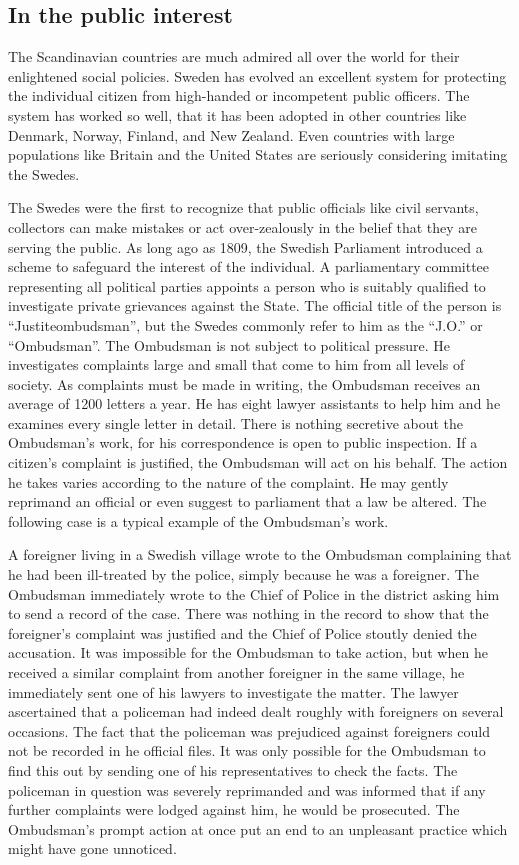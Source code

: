 \documentclass[11pt]{article}
\begin{document}
\subsection{In the public interest}
\label{sec-1-53}

The Scandinavian countries are much admired all over the world for their enlightened social policies. Sweden has evolved an excellent system for protecting the individual citizen from high-handed or incompetent public officers. The system has worked so well, that it has been adopted in other countries like Denmark, Norway, Finland, and New Zealand. Even countries with large populations like Britain and the United States are seriously considering imitating the Swedes.

The Swedes were the first to recognize that public officials like civil servants, collectors can make mistakes or act over-zealously in the belief that they are serving the public. As long ago as 1809, the Swedish Parliament introduced a scheme to safeguard the interest of the individual. A parliamentary committee representing all political parties appoints a person who is suitably qualified to investigate private grievances against the State. The official title of the person is ``Justiteombudsman'', but the Swedes commonly refer to him as the ``J.O.'' or ``Ombudsman''. The Ombudsman is not subject to political pressure. He investigates complaints large and small that come to him from all levels of society. As complaints must be made in writing, the Ombudsman receives an average of 1200 letters a year. He has eight lawyer assistants to help him and he examines every single letter in detail. There is nothing secretive about the Ombudsman's work, for his correspondence is open to public inspection. If a citizen's complaint is justified, the Ombudsman will act on his behalf. The action he takes varies according to the nature of the complaint. He may gently reprimand an official or even suggest to parliament that a law be altered. The following case is a typical example of the Ombudsman's work. 

A foreigner living in a Swedish village wrote to the Ombudsman complaining that he had been ill-treated by the police, simply because he was a foreigner. The Ombudsman immediately wrote to the Chief of Police in the district asking him to send a record of the case. There was nothing in the record to show that the foreigner's complaint was justified and the Chief of Police stoutly denied the accusation. It was impossible for the Ombudsman to take action, but when he received a similar complaint from another foreigner in the same village, he immediately sent one of his lawyers to investigate the matter. The lawyer ascertained that a policeman had indeed dealt roughly with foreigners on several occasions. The fact that the policeman was prejudiced against foreigners could not be recorded in he official files. It was only possible for the Ombudsman to find this out by sending one of his representatives to check the facts. The policeman in question was severely reprimanded and was informed that if any further complaints were lodged against him, he would be prosecuted. The Ombudsman's prompt action at once put an end to an unpleasant practice which might have gone unnoticed.
\end{document}
